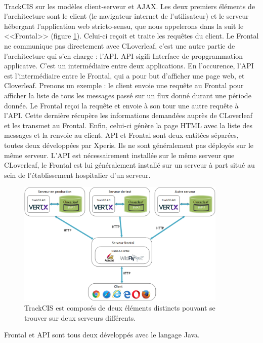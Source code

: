 			\paragraph{}%
			TrackCIS sur les modèles client-serveur et AJAX. Les deux
			premiers éléments de l'architecture sont le client (le navigateur internet
			de l'utilisateur) et le serveur hébergant l'application web stricto-sensu,
			que nous appelerons dans la suit le <<Frontal>> (figure
			\ref{archi_trackcis}).
			Celui-ci reçoit et traite les requêtes du client. Le Frontal ne communique pas directement avec
			CLoverleaf, c'est une autre partie de l'architecture qui s'en charge : l'API.
			API sigifi Interface de propgrammation applicatve. C'est un intermédiaire
			entre deux applications. En l'occurence, l'API est l'intermédiaire entre le
			Frontal, qui a pour but d'afficher une page web, et Cloverleaf. Prenons un
			exemple : le client envoie une requête au Frontal pour afficher la liste de
			tous les messages passé sur un flux donné durant une période donnée. Le
			Frontal reçoi la requête et envoie à son tour une autre requête à l'API.
			Cette dernière récupère les informations demandées auprès de CLoverleaf et
			les transmet au Frontal. Enfin, celui-ci génère la page HTML avec la liste
			des messages et la renvoie au client.\newline
			API et Frontal sont deux entitées séparées, toutes deux développées par
			Xperis. Ils ne sont généralement pas déployés sur le même serveur. L'API est
			nécessairement installée sur le même serveur que CLoverleaf, le Frontal est
			lui généralement installé sur un serveur à part situé au
			sein de l'établissement hospitalier d'un serveur.
			\begin{figure}[H]%
				\centering
				\includegraphics[width=10cm]{../img/part3/archi_trackcis.png}
				\caption{\label{archi_trackcis} TrackCIS est composés de deux éléments
				distincts pouvant se trouver sur deux serveurs différents.}
			\end{figure}
			Frontal et API sont tous deux développés avec le langage Java.
			
